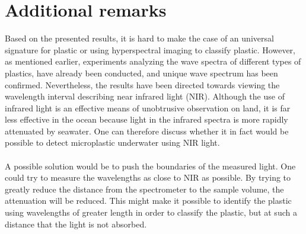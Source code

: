 \section{Additional remarks}
Based on the presented results, it is hard to make the case of an universal signature for plastic or using hyperspectral imaging to classify plastic. However, as mentioned earlier, experiments analyzing the wave spectra of different types of plastics, have already been conducted, and unique wave spectrum has been confirmed. Nevertheless, the results have been directed towards viewing the wavelength interval describing near infrared light (NIR). Although the use of infrared light is an effective means of unobtrusive observation on land, it is far less effective in the ocean because light in the infrared spectra is more rapidly attenuated by seawater. One can therefore discuss whether it in fact would be possible to detect microplastic underwater using NIR light.
\\\\
A possible solution would be to push the boundaries of the measured light. One could try to measure the wavelengths as close to NIR as possible. By trying to greatly reduce the distance from the spectrometer to the sample volume, the attenuation will be reduced. This might make it possible to identify the plastic using wavelengths of greater length in order to classify the plastic, but at such a distance that the light is not absorbed.
\\\\
\\\\



